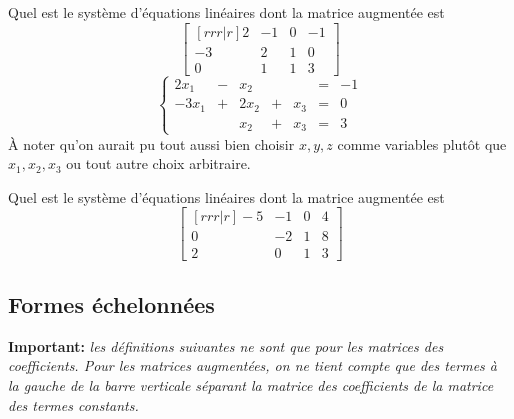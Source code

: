 \begin{exemple}
Quel est le système d'équations linéaires dont la matrice augmentée est
	\[
	\begin{bmatrix}[rrr|r]
		2 & -1& 0 & -1\\
		-3 &2& 1& 0\\
		0 & 1 & 1& 3
	\end{bmatrix}
	\]
\solution
	\[
	\left\{ \begin{matrix}
		2x_1 &-& x_2 &&  &=& -1\\
		-3x_1&+& 2x_2 &+& x_3 &=& 0\\
		&& x_2 &+& x_3 &=& 3
		\end{matrix}\right.
	\]
	À noter qu'on aurait pu tout aussi bien choisir $x, y, z$ comme variables
	plutôt que $x_1, x_2, x_3$ ou tout autre choix arbitraire.
\end{exemple}

\begin{exerciceB}
Quel est le système d'équations linéaires dont la matrice augmentée est
	\[
	\begin{bmatrix}[rrr|r]
		-5 & -1& 0 & 4\\
		0 &-2& 1& 8\\
		2 & 0 & 1& 3
	\end{bmatrix}
	\]
\end{exerciceB}


\subsection{Formes échelonnées}

\textbf{Important: } \textit{les définitions suivantes ne sont que pour les matrices des coefficients. 
Pour les matrices augmentées, on ne tient compte que des termes à la gauche de la
barre verticale séparant la matrice des coefficients de la matrice des termes constants.}

